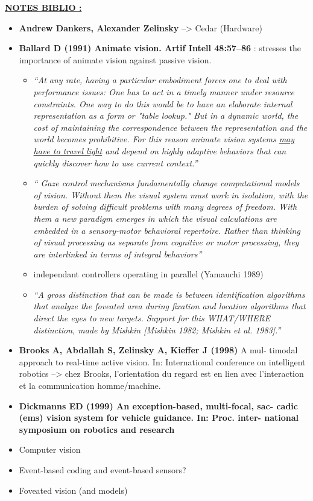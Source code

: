 \documentclass[12pt,twoside,openright]{article}
\begin{document}
    {\color{magenta} \uline{\bf NOTES BIBLIO  :}
    \begin{itemize}
    	\item {\bf Andrew Dankers, Alexander Zelinsky} --> Cedar (Hardware)
    	\item {\bf Ballard D (1991) Animate vision. Artif Intell 48:57–86} : stresses the importance of animate vision against passive vision. 
    	\begin{itemize}
    		\item \emph{``At any rate, having a particular embodiment forces
    			one to deal with performance issues: One has to act in a timely manner under resource constraints.
    			One way to do this would be to have an elaborate internal representation as a form or "table lookup." But in a dynamic world, the cost of maintaining the correspondence between the representation and the world becomes prohibitive. For this reason animate vision systems \uline{may have to travel light} and depend on highly adaptive behaviors that can quickly discover how to use current context.''}
    		\item \emph{`` Gaze control mechanisms fundamentally change computational models of vision. Without
    			them the visual system must work in isolation, with the burden of solving difficult problems with
    			many degrees of freedom. With them a new paradigm emerges in which the visual calculations are
    			embedded in a sensory-motor behavioral repertoire. Rather than thinking of visual
    			processing as separate from cognitive or motor processing, they are interlinked
    			in terms of integral behaviors''}
    		\item independant controllers operating in parallel	(Yamauchi 1989)
    		\item \emph{``A gross distinction that
    			can be made is between identification algorithms that analyze the foveated area during fixation and
    			location algorithms that direct the eyes to new targets. Support for this WHAT/WHERE distinction, made by Mishkin [Mishkin 1982; Mishkin et al. 1983].''}
    	\end{itemize}
    	\item  {\bf Brooks A, Abdallah S, Zelinsky A, Kieffer J (1998)} A mul-
    	timodal approach to real-time active vision. In: International
    	conference on intelligent robotics --> chez Brooks, l'orientation du regard est en lien avec l'interaction et la communication homme/machine.
    	\item {\bf Dickmanns ED (1999) An exception-based, multi-focal, sac-
    		cadic (ems) vision system for vehicle guidance. In: Proc. inter-
    		national symposium on robotics and research}
    	\item Computer vision
    	\item Event-based coding and event-based  sensors?
    	\item Foveated vision (and models)
    \end{itemize}	}
    
\end{document}
